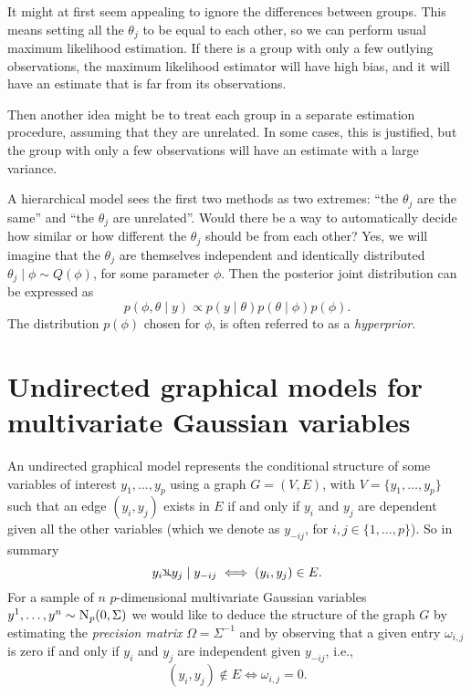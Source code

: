 \documentclass[a4paper, 11pt, oneside]{report}
\newcommand{\1}{\mathds{1}}
\newcommand{\inv}{^{-1}}
\newcommand{\Np}{\textsc{N}_p}
\newcommand{\nindep}{{\rotatebox[origin=c]{90}{$\nvDash$}}}
\begin{document}
It might at first seem appealing to ignore the differences between groups. This
means setting all the $\theta_j$ to be equal to each other, so we can perform
usual maximum likelihood estimation. If there is a group with only a few
outlying observations, the maximum likelihood estimator will have high bias, and it will have an estimate that is far from its observations.

Then another idea might be to treat each group in a separate estimation procedure, assuming
that they are unrelated. In some cases, this is
justified, but the group with only a few
observations will have an estimate with a large variance.

A hierarchical model sees the first two methods as two
extremes: ``the $\theta_j$ are the same'' and ``the $\theta_j$ are unrelated''.
Would there be a way to automatically decide how similar or how different the $\theta_j$ should be from each other?
Yes, we will imagine that the $\theta_j$ are themselves independent and identically distributed
$\theta_j \mid \phi \sim Q(\phi)$, for some parameter $\phi$. Then the posterior
joint distribution can be expressed as
\[p(\phi, \theta \mid y) \propto p(y \mid \theta) p(\theta \mid \phi) p(\phi).\]
The distribution $p(\phi)$ chosen for $\phi$, is often
referred to as a \emph{hyperprior}.

\chapter{Undirected graphical models for multivariate Gaussian
  variables}\label{sect:graphs}
An undirected graphical model represents the conditional
structure of some variables of interest $y_1, \dots, y_p$ using a
graph $G=(V, E)$, with $V = \{y_1, \dots, y_p\}$ such that an edge $(y_i, y_j)$
exists in $E$ if and only if $y_i$ and $y_j$ are dependent given all the other
variables (which we denote as $y_{-ij}$, for $i,j \in \{1,\dots,p\}$). So in summary
\[y_i \nindep y_j \mid y_{-ij} \iff (y_i, y_j) \in E.\]
For a sample
of $n$ $p$-dimensional multivariate Gaussian variables $y^1, \dots, y^n \sim
	\Np(0, \Sigma)$ we would like to deduce the structure of the graph $G$ by
estimating the \emph{precision matrix} $\Omega =
	\Sigma\inv$ and by observing that a given entry $\omega_{i,j}$ is zero if and only if $y_i$ and $y_j$ are
independent given $y_{-ij}$, i.e.,
\[(y_i, y_j) \notin E \iff \omega_{i,j} = 0.\]
\end{document}
